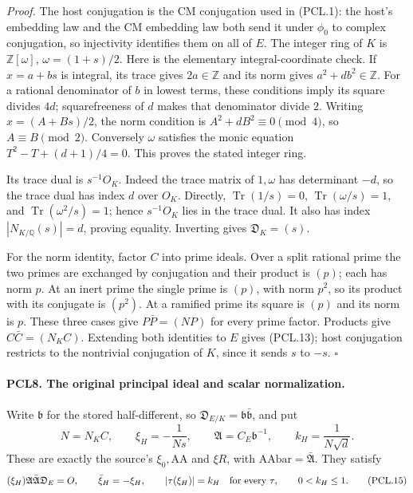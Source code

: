\documentclass[11pt,a4paper]{article}
\numberwithin{equation}{section}
\theoremstyle{remark}\newtheorem{remark}[theorem]{Remark}
\begin{document}
\emph{Proof.}
The host conjugation is the CM conjugation used in
(PCL.1): the host's embedding law and the CM embedding
law both send it under \(\phi_0\) to complex conjugation,
so injectivity identifies them on all of \(E\).
The integer ring of \(K\) is
\(\mathbb Z[\omega]\), \(\omega=(1+s)/2\).
Here is the elementary integral-coordinate check.  If
\(x=a+bs\) is integral, its trace gives \(2a\in\mathbb Z\)
and its norm gives \(a^2+db^2\in\mathbb Z\).
For a rational denominator of \(b\) in lowest terms,
these conditions imply its square divides \(4d\);
squarefreeness of \(d\) makes that denominator divide
\(2\).  Writing \(x=(A+Bs)/2\), the norm condition is
\(A^2+dB^2\equiv0\pmod4\), so \(A\equiv B\pmod2\).
Conversely \(\omega\) satisfies the monic equation
\(T^2-T+(d+1)/4=0\).  This proves the stated integer ring.

Its trace dual is \(s^{-1}O_K\).  Indeed the trace matrix
of \(1,\omega\) has determinant \(-d\), so the trace dual
has index \(d\) over \(O_K\).  Directly,
\(\operatorname{Tr}(1/s)=0\),
\(\operatorname{Tr}(\omega/s)=1\), and
\(\operatorname{Tr}(\omega^2/s)=1\); hence
\(s^{-1}O_K\) lies in the trace dual.  It also has index
\(|N_{K/\mathbb Q}(s)|=d\), proving equality.
Inverting gives \(\mathfrak D_K=(s)\).

For the norm identity, factor \(C\) into prime ideals.
Over a split rational prime the two primes are exchanged
by conjugation and their product is \((p)\); each has
norm \(p\).  At an inert prime the single prime is
\((p)\), with norm \(p^2\), so its product with its
conjugate is \((p^2)\).  At a ramified prime its square
is \((p)\) and its norm is \(p\).  These three cases
give \(P\bar P=(NP)\) for every prime factor.  Products
give \(C\bar C=(N_K C)\).  Extending both identities
to \(E\) gives (PCL.13); host conjugation restricts to
the nontrivial conjugation of \(K\), since it sends
\(s\) to \(-s\). \hfill\(\square\)

\paragraph{PCL8. The original principal ideal and scalar normalization.}
\label{claim:PCL8}
Write \(\mathfrak b\) for the stored half-different, so
\(\mathfrak D_{E/K}=\mathfrak b\bar{\mathfrak b}\), and put
\[
 N=N_K C,\qquad
 \xi_H=-\frac1{Ns},\qquad
 \mathfrak A=C_E\mathfrak b^{-1},\qquad
 k_H=\frac1{N\sqrt d}.                              \tag{PCL.14}
\]
These are exactly the source's \(\xi_0,\mathrm{AA}\) and
\(\xi R\), with \(\mathrm{AAbar}=\bar{\mathfrak A}\).
They satisfy
\[
 (\xi_H)\mathfrak A\bar{\mathfrak A}\mathfrak D_E=O,
 \qquad \bar\xi_H=-\xi_H,
 \qquad |\tau(\xi_H)|=k_H\quad\hbox{for every }\tau,
 \qquad 0<k_H\le1.                                 \tag{PCL.15}
\]
\end{document}
